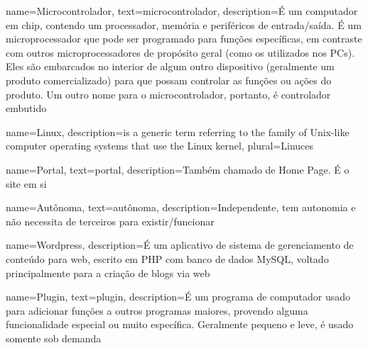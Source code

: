 {
  name=Microcontrolador,
  text=microcontrolador,
  description={É um computador em chip, contendo um processador, memória e periféricos de entrada/saída. É um microprocessador que pode ser programado para funções específicas, em contraste com outros microprocessadores de propósito geral (como os utilizados nos PCs). Eles são embarcados no interior de algum outro dispositivo (geralmente um produto comercializado) para que possam controlar as funções ou ações do produto. Um outro nome para o microcontrolador, portanto, é controlador embutido}
}

{
  name=Linux,
  description={is a generic term referring to the family of Unix-like
               computer operating systems that use the Linux kernel},
  plural=Linuces
}

{
  name=Portal,
  text=portal,
  description={Também chamado de Home Page. É o site em si}
}

{
  name=Autônoma,
  text=aut\^onoma,
  description={Independente, tem autonomia e não necessita de terceiros para existir/funcionar}
}

{
  name=Wordpress,
  description={É um aplicativo de sistema de gerenciamento de conteúdo para web, escrito em PHP com banco de dados MySQL, voltado principalmente para a criação de blogs via web}
}

{
  name=Plugin,
  text=plugin,
  description={É um programa de computador usado para adicionar funções a outros programas maiores, provendo alguma funcionalidade especial ou muito específica. Geralmente pequeno e leve, é usado somente sob demanda}
}



